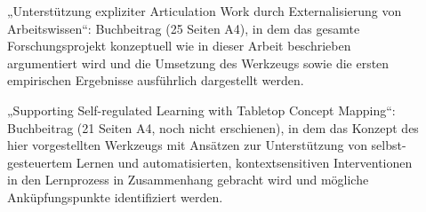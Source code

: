 \begin{description}
	\item[\citet{Oppl10}] „Unterstützung expliziter Articulation Work durch Externalisierung von Arbeitswissen“: Buchbeitrag (25 Seiten A4), in dem das gesamte Forschungsprojekt konzeptuell wie in dieser Arbeit beschrieben argumentiert wird und die Umsetzung des Werkzeugs sowie die ersten empirischen Ergebnisse ausführlich dargestellt werden.
	\item[\cite{Oppl10a}] „Supporting Self-regulated Learning with Tabletop Concept Mapping“: Buchbeitrag (21 Seiten A4, noch nicht erschienen), in dem das Konzept des hier vorgestellten Werkzeugs mit Ansätzen zur Unterstützung von selbst-gesteuertem Lernen und automatisierten, kontextsensitiven Interventionen in den Lernprozess in Zusammenhang gebracht wird und mögliche Anküpfungspunkte identifiziert werden.
\end{description}
